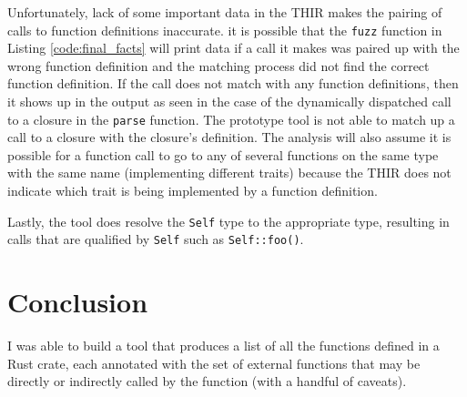 \documentclass[11pt]{article}
\begin{document}
Unfortunately, lack of some important data in the THIR makes the pairing of calls to function definitions inaccurate.
it is possible that the \lstinline{fuzz} function in Listing \ref{code:final_facts} will print data if a call it makes was paired up with the wrong function definition and the matching process did not find the correct function definition.
If the call does not match with any function definitions, then it shows up in the output as seen in the case of the dynamically dispatched call to a closure in the \lstinline{parse} function.
The prototype tool is not able to match up a call to a closure with the closure's definition.
The analysis will also assume it is possible for a function call to go to any of several functions on the same type with the same name (implementing different traits) because the THIR does not indicate which trait is being implemented by a function definition.

Lastly, the tool does resolve the \lstinline{Self} type to the appropriate type, resulting in calls that are qualified by \lstinline{Self} such as \lstinline{Self::foo()}.





\section{Conclusion}

I was able to build a tool that produces a list of all the functions defined in a Rust crate, each annotated with the set of external functions that may be directly or indirectly called by the function (with a handful of caveats).
\end{document}
